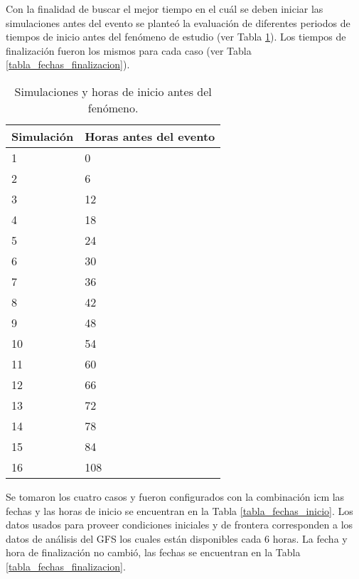 Con la finalidad de buscar el mejor tiempo en el cuál se deben iniciar las simulaciones antes del evento se planteó la evaluación de diferentes periodos de tiempos de inicio antes del fenómeno de estudio (ver Tabla \ref{tab_horas_inicio}). Los tiempos de finalización fueron los mismos para cada caso (ver Tabla \ref{tabla_fechas_finalizacion}).\\ 

\begin{table}[h]
\caption{Simulaciones y horas de inicio antes del fenómeno.}
\label{tab_horas_inicio}
\centering
\begin{tabular}{ll}
Simulación & Horas antes del evento \\ \hline
1 & 0 \\
2 & 6 \\
3 & 12 \\
4 & 18 \\
5 & 24 \\
6 & 30 \\
7 & 36 \\
8 & 42 \\
9 & 48 \\
10 & 54 \\
11 & 60 \\
12 & 66 \\
13 & 72 \\
14 & 78 \\
15 & 84 \\
16 & 108
\end{tabular}
\end{table}

Se tomaron los cuatro casos y fueron configurados con la combinación icm las fechas y las horas de inicio se encuentran en la Tabla \ref{tabla_fechas_inicio}. Los datos usados para proveer condiciones iniciales y de frontera corresponden a los datos de análisis del GFS los cuales están disponibles cada 6 horas. La fecha y hora de finalización no cambió, las fechas se encuentran en la Tabla \ref{tabla_fechas_finalizacion}.

